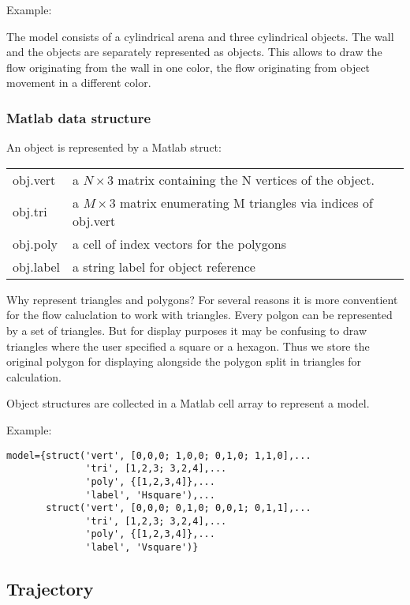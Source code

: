 \documentclass[a4paper]{article}
\begin{document}
Example:

The model consists of a cylindrical arena and three cylindrical
objects. The wall and the objects are separately represented as
objects. This allows to draw the flow originating from the wall in one
color, the flow originating from object movement in a different color.

\subsubsection{Matlab data structure}

An object is represented by a Matlab struct:

\begin{tabular}{ll}
obj.vert & a $N \times 3$ matrix containing the N vertices of the
object.\\ 

obj.tri & a $M \times 3$ matrix enumerating M triangles via indices of
obj.vert\\

obj.poly & a cell of index vectors for the polygons\\

obj.label & a string label for object reference
\end{tabular}

Why represent triangles and polygons? For several reasons it is more
conventient for the flow caluclation to work with triangles. Every
polgon can be represented by a set of triangles. But for display
purposes it may be confusing to draw triangles where the user
specified a square or a hexagon. Thus we store the original polygon
for displaying alongside the polygon split in triangles for
calculation.

Object structures are collected in a Matlab cell array to represent a
model.

Example:

\begin{verbatim}
model={struct('vert', [0,0,0; 1,0,0; 0,1,0; 1,1,0],...
              'tri', [1,2,3; 3,2,4],...
              'poly', {[1,2,3,4]},...
              'label', 'Hsquare'),...
       struct('vert', [0,0,0; 0,1,0; 0,0,1; 0,1,1],...
              'tri', [1,2,3; 3,2,4],...
              'poly', {[1,2,3,4]},...
              'label', 'Vsquare')}
\end{verbatim}

\subsection{Trajectory}
\end{document}
